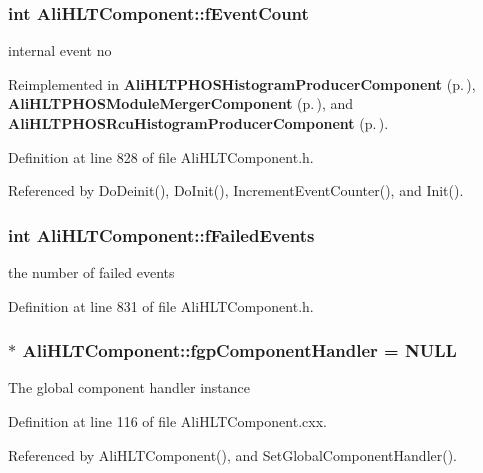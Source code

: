 \subsubsection{\setlength{\rightskip}{0pt plus 5cm}int {\bf Ali\-HLTComponent::f\-Event\-Count}\hspace{0.3cm}{\tt  [private]}}\label{classAliHLTComponent_r2}


internal event no 

Reimplemented in {\bf Ali\-HLTPHOSHistogram\-Producer\-Component} {\rm (p.\,\pageref{classAliHLTPHOSHistogramProducerComponent_r3})}, {\bf Ali\-HLTPHOSModule\-Merger\-Component} {\rm (p.\,\pageref{classAliHLTPHOSModuleMergerComponent_r0})}, and {\bf Ali\-HLTPHOSRcu\-Histogram\-Producer\-Component} {\rm (p.\,\pageref{classAliHLTPHOSRcuHistogramProducerComponent_r0})}.

Definition at line 828 of file Ali\-HLTComponent.h.

Referenced by Do\-Deinit(), Do\-Init(), Increment\-Event\-Counter(), and Init().
\subsubsection{\setlength{\rightskip}{0pt plus 5cm}int {\bf Ali\-HLTComponent::f\-Failed\-Events}\hspace{0.3cm}{\tt  [private]}}\label{classAliHLTComponent_r3}


the number of failed events 

Definition at line 831 of file Ali\-HLTComponent.h.
\subsubsection{ $\ast$ {\bf Ali\-HLTComponent::fgp\-Component\-Handler} = NULL\hspace{0.3cm}{\tt  [static, private]}}\label{classAliHLTComponent_v0}


The global component handler instance 

Definition at line 116 of file Ali\-HLTComponent.cxx.

Referenced by Ali\-HLTComponent(), and Set\-Global\-Component\-Handler().

